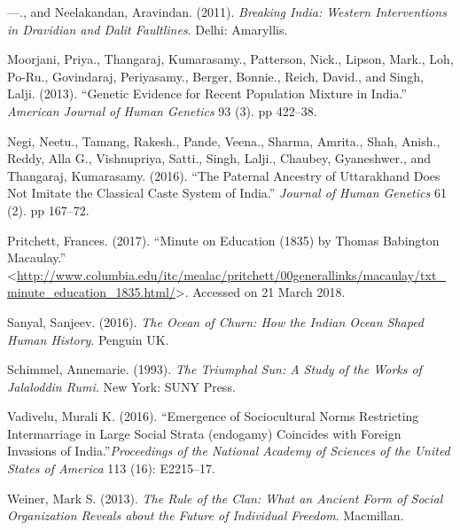 \begin{thebibliography}{99}
  ---., and Neelakandan, Aravindan. (2011). \textit{Breaking India: Western Interventions in Dravidian and Dalit Faultlines}. Delhi: Amaryllis.

  Moorjani, Priya., Thangaraj, Kumarasamy., Patterson, Nick., Lipson, Mark., Loh, Po-Ru., Govindaraj, Periyasamy., Berger, Bonnie., Reich, David., and Singh, Lalji. (2013). “Genetic Evidence for Recent Population Mixture in India.” \textit{American Journal of Human Genetics} 93 (3). pp 422–38.

  Negi, Neetu., Tamang, Rakesh., Pande, Veena., Sharma, Amrita., Shah, Anish., Reddy, Alla G., Vishnupriya, Satti., Singh, Lalji., Chaubey, Gyaneshwer., and Thangaraj, Kumarasamy. (2016). “The Paternal Ancestry of Uttarakhand Does Not Imitate the Classical Caste System of India.” \textit{Journal of Human Genetics} 61 (2). pp 167–72.

  Pritchett, Frances. (2017). “Minute on Education (1835) by Thomas Babington Macaulay.” \textless \url{http://www.columbia.edu/itc/mealac/pritchett/00generallinks/macaulay/txt_minute_education_1835.html/}\textgreater. Accessed on 21 March 2018.

  Sanyal, Sanjeev. (2016). \textit{The Ocean of Churn: How the Indian Ocean Shaped Human History}. Penguin UK.

  Schimmel, Annemarie. (1993). \textit{The Triumphal Sun: A Study of the Works of Jalaloddin Rumi}. New York: SUNY Press.

  Vadivelu, Murali K. (2016). “Emergence of Sociocultural Norms Restricting Intermarriage in Large Social Strata (endogamy) Coincides with Foreign Invasions of India.”\textit{Proceedings of the National Academy of Sciences of the United States of America} 113 (16): E2215–17.

  Weiner, Mark S. (2013). \textit{The Rule of the Clan: What an Ancient Form of Social Organization Reveals about the Future of Individual Freedom}. Macmillan.

 \end{thebibliography}

\theendnotes

